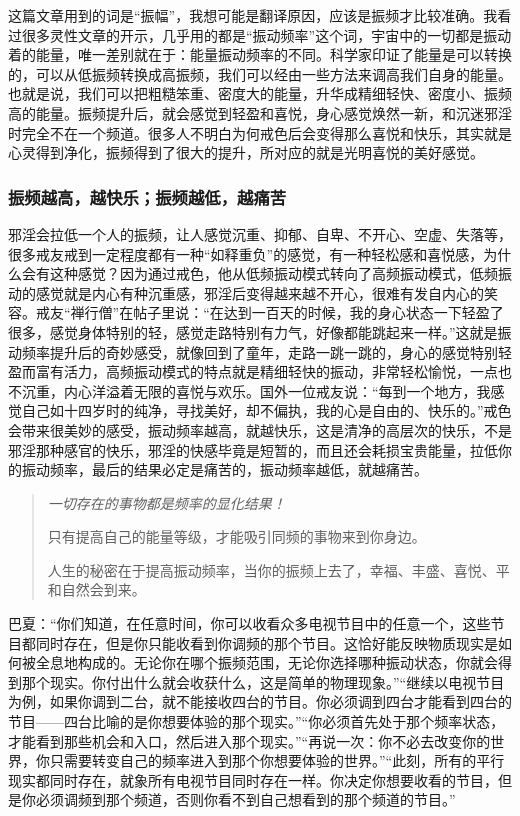这篇文章用到的词是“振幅”，我想可能是翻译原因，应该是振频才比较准确。我看过很多灵性文章的开示，几乎用的都是“振动频率”这个词，宇宙中的一切都是振动着的能量，唯一差别就在于：能量振动频率的不同。科学家印证了能量是可以转换的，可以从低振频转换成高振频，我们可以经由一些方法来调高我们自身的能量。也就是说，我们可以把粗糙笨重、密度大的能量，升华成精细轻快、密度小、振频高的能量。振频提升后，就会感觉到轻盈和喜悦，身心感觉焕然一新，和沉迷邪淫时完全不在一个频道。很多人不明白为何戒色后会变得那么喜悦和快乐，其实就是心灵得到净化，振频得到了很大的提升，所对应的就是光明喜悦的美好感觉。

\subsubsection{振频越高，越快乐；振频越低，越痛苦}

邪淫会拉低一个人的振频，让人感觉沉重、抑郁、自卑、不开心、空虚、失落等，很多戒友戒到一定程度都有一种“如释重负”的感觉，有一种轻松感和喜悦感，为什么会有这种感觉？因为通过戒色，他从低频振动模式转向了高频振动模式，低频振动的感觉就是内心有种沉重感，邪淫后变得越来越不开心，很难有发自内心的笑容。戒友“禅行僧”在帖子里说：“在达到一百天的时候，我的身心状态一下轻盈了很多，感觉身体特别的轻，感觉走路特别有力气，好像都能跳起来一样。”这就是振动频率提升后的奇妙感受，就像回到了童年，走路一跳一跳的，身心的感觉特别轻盈而富有活力，高频振动模式的特点就是精细轻快的振动，非常轻松愉悦，一点也不沉重，内心洋溢着无限的喜悦与欢乐。国外一位戒友说：“每到一个地方，我感觉自己如十四岁时的纯净，寻找美好，却不偏执，我的心是自由的、快乐的。”戒色会带来很美妙的感受，振动频率越高，就越快乐，这是清净的高层次的快乐，不是邪淫那种感官的快乐，邪淫的快感毕竟是短暂的，而且还会耗损宝贵能量，拉低你的振动频率，最后的结果必定是痛苦的，振动频率越低，就越痛苦。

\begin{quotation}\it
    一切存在的事物都是频率的显化结果！

    只有提高自己的能量等级，才能吸引同频的事物来到你身边。

    人生的秘密在于提高振动频率，当你的振频上去了，幸福、丰盛、喜悦、平和自然会到来。
\end{quotation}

巴夏：“你们知道，在任意时间，你可以收看众多电视节目中的任意一个，这些节目都同时存在，但是你只能收看到你调频的那个节目。这恰好能反映物质现实是如何被全息地构成的。无论你在哪个振频范围，无论你选择哪种振动状态，你就会得到那个现实。你付出什么就会收获什么，这是简单的物理现象。”“继续以电视节目为例，如果你调到二台，就不能接收四台的节目。你必须调到四台才能看到四台的节目——四台比喻的是你想要体验的那个现实。”“你必须首先处于那个频率状态，才能看到那些机会和入口，然后进入那个现实。”“再说一次：你不必去改变你的世界，你只需要转变自己的频率进入到那个你想要体验的世界。”“此刻，所有的平行现实都同时存在，就象所有电视节目同时存在一样。你决定你想要收看的节目，但是你必须调频到那个频道，否则你看不到自己想看到的那个频道的节目。”

